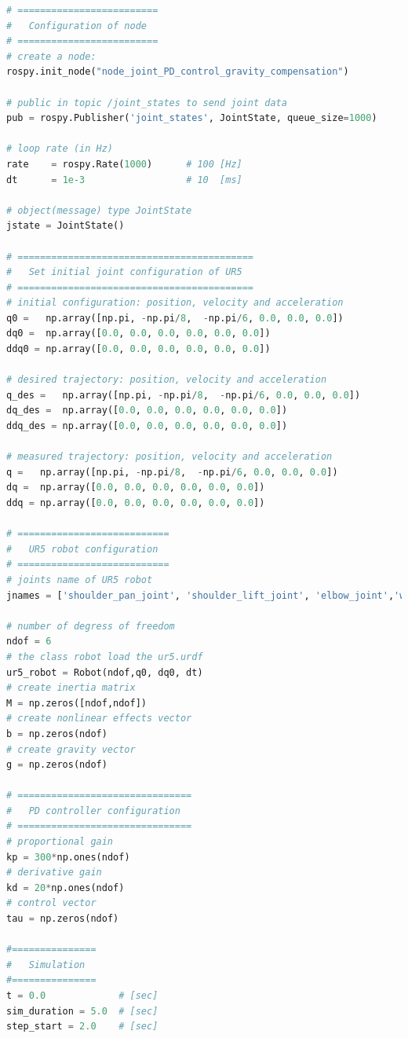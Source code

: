 \begin{lstlisting}[language=Python,caption={Move the second and fifth joint of UR5 robot with the requirement motion of activity 1.6.1}, label={lst:joint_PD_gravity_compensation_control_method_step}]
# =========================
#   Configuration of node
# =========================
# create a node: 
rospy.init_node("node_joint_PD_control_gravity_compensation")

# public in topic /joint_states	to send joint data	
pub = rospy.Publisher('joint_states', JointState, queue_size=1000)

# loop rate (in Hz)
rate 	= rospy.Rate(1000)		# 100 [Hz]
dt 		= 1e-3					# 10  [ms]

# object(message) type JointState
jstate = JointState()

# ==========================================
#   Set initial joint configuration of UR5
# ==========================================
# initial configuration: position, velocity and acceleration 
q0 =   np.array([np.pi, -np.pi/8,  -np.pi/6, 0.0, 0.0, 0.0])
dq0 =  np.array([0.0, 0.0, 0.0, 0.0, 0.0, 0.0]) 
ddq0 = np.array([0.0, 0.0, 0.0, 0.0, 0.0, 0.0]) 

# desired trajectory: position, velocity and acceleration
q_des =   np.array([np.pi, -np.pi/8,  -np.pi/6, 0.0, 0.0, 0.0]) 
dq_des =  np.array([0.0, 0.0, 0.0, 0.0, 0.0, 0.0]) 
ddq_des = np.array([0.0, 0.0, 0.0, 0.0, 0.0, 0.0]) 

# measured trajectory: position, velocity and acceleration
q =   np.array([np.pi, -np.pi/8,  -np.pi/6, 0.0, 0.0, 0.0])
dq =  np.array([0.0, 0.0, 0.0, 0.0, 0.0, 0.0]) 
ddq = np.array([0.0, 0.0, 0.0, 0.0, 0.0, 0.0]) 

# ===========================
#   UR5 robot configuration
# ===========================
# joints name of UR5 robot
jnames = ['shoulder_pan_joint', 'shoulder_lift_joint', 'elbow_joint','wrist_1_joint', 'wrist_2_joint', 'wrist_3_joint']

# number of degress of freedom
ndof = 6
# the class robot load the ur5.urdf
ur5_robot = Robot(ndof,q0, dq0, dt)
# create inertia matrix 
M = np.zeros([ndof,ndof])
# create nonlinear effects vector
b = np.zeros(ndof)
# create gravity vector
g = np.zeros(ndof)

# ===============================
#   PD controller configuration
# ===============================
# proportional gain
kp = 300*np.ones(ndof)
# derivative gain
kd = 20*np.ones(ndof)
# control vector
tau = np.zeros(ndof)    

#===============
#   Simulation
#===============
t = 0.0             # [sec] 
sim_duration = 5.0  # [sec]
step_start = 2.0    # [sec]


\end{lstlisting}
